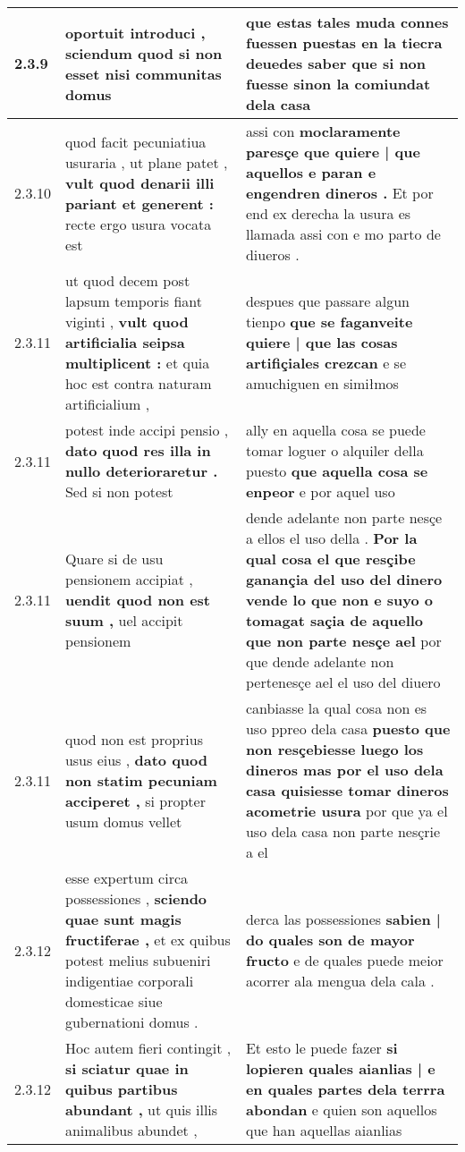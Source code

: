 \begin{tabular}{|p{1cm}|p{6.5cm}|p{6.5cm}|}
2.3.9 & oportuit introduci , \textbf{ sciendum quod si non esset } nisi communitas domus & que estas tales muda connes fuessen puestas en la \textbf{ tiecra deuedes saber } que si non fuesse sinon la comiundat dela casa \\\hline
2.3.10 & quod facit pecuniatiua usuraria , ut plane patet , \textbf{ vult quod denarii illi pariant et generent : } recte ergo usura vocata est & assi con \textbf{ moclaramente paresçe que quiere | que aquellos e paran e engendren dineros . } Et por end ex derecha la usura es llamada assi con e mo parto de diueros . \\\hline
2.3.11 & ut quod decem post lapsum temporis fiant viginti , \textbf{ vult quod artificialia seipsa multiplicent : } et quia hoc est contra naturam artificialium , & despues que passare algun tienpo \textbf{ que se faganveite quiere | que las cosas artifiçiales crezcan } e se amuchiguen en simiłmos \\\hline
2.3.11 & potest inde accipi pensio , \textbf{ dato quod res illa in nullo deterioraretur . } Sed si non potest & ally en aquella cosa se puede tomar loguer o alquiler della puesto \textbf{ que aquella cosa se enpeor } e por aquel uso \\\hline
2.3.11 & Quare si de usu pensionem accipiat , \textbf{ uendit quod non est suum , } uel accipit pensionem & dende adelante non parte nesçe a ellos el uso della . \textbf{ Por la qual cosa el que resçibe ganançia del uso del dinero vende lo que non e suyo o tomagat saçia de aquello que non parte nesçe ael } por que dende adelante non pertenesçe ael el uso del diuero \\\hline
2.3.11 & quod non est proprius usus eius , \textbf{ dato quod non statim pecuniam acciperet , } si propter usum domus vellet & canbiasse la qual cosa non es uso ppreo dela casa \textbf{ puesto que non resçebiesse luego los dineros mas por el uso dela casa quisiesse tomar dineros acometrie usura } por que ya el uso dela casa non parte nesçrie a el \\\hline
2.3.12 & esse expertum circa possessiones , \textbf{ sciendo quae sunt magis fructiferae , } et ex quibus potest melius subueniri indigentiae corporali domesticae siue gubernationi domus . & derca las possessiones \textbf{ sabien | do quales son de mayor fructo } e de quales puede meior acorrer ala mengua dela cala . \\\hline
2.3.12 & Hoc autem fieri contingit , \textbf{ si sciatur quae in quibus partibus abundant , } ut quis illis animalibus abundet , & Et esto le puede fazer \textbf{ si lopieren quales aianlias | e en quales partes dela terrra abondan } e quien son aquellos que han aquellas aianlias \\\hline

\end{tabular}
